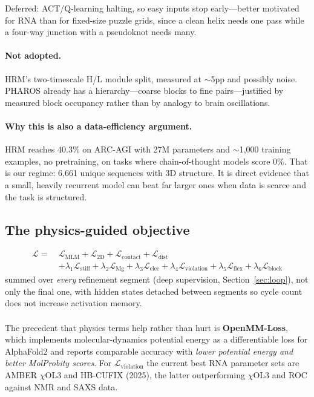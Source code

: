 \documentclass[11pt,a4paper]{article}
\begin{document}
\noindent Deferred: ACT/Q-learning halting, so easy inputs stop early---better
motivated for RNA than for fixed-size puzzle grids, since a clean helix needs one
pass while a four-way junction with a pseudoknot needs many.

\paragraph{Not adopted.} HRM's two-timescale H/L module split, measured at
$\sim$5pp and possibly noise. PHAROS already has a hierarchy---coarse blocks to
fine pairs---justified by measured block occupancy rather than by analogy to
brain oscillations.

\paragraph{Why this is also a data-efficiency argument.} HRM reaches $40.3\%$ on
ARC-AGI with 27M parameters and $\sim$1{,}000 training examples, no pretraining,
on tasks where chain-of-thought models score $0\%$. That is our regime: 6{,}661
unique sequences with 3D structure. It is direct evidence that a small, heavily
recurrent model can beat far larger ones when data is scarce and the task is
structured.

\subsection{The physics-guided objective}
\begin{align}
\mathcal{L} =\ & \mathcal{L}_{\text{MLM}} + \mathcal{L}_{\text{2D}} + \mathcal{L}_{\text{contact}} + \mathcal{L}_{\text{dist}} \nonumber\\
 &+ \lambda_1 \mathcal{L}_{\text{stiff}} + \lambda_2 \mathcal{L}_{\mathrm{Mg}} + \lambda_3 \mathcal{L}_{\text{elec}} + \lambda_4 \mathcal{L}_{\text{violation}} + \lambda_5 \mathcal{L}_{\text{flex}} + \lambda_6 \mathcal{L}_{\text{block}}
\end{align}
\noindent summed over \emph{every} refinement segment (deep supervision,
Section~\ref{sec:loop}), not only the final one, with hidden states detached
between segments so cycle count does not increase activation memory.
\begin{align}
\end{align}

The precedent that physics terms help rather than hurt is \textbf{OpenMM-Loss},
which implements molecular-dynamics potential energy as a differentiable loss for
AlphaFold2 and reports comparable accuracy with \emph{lower potential energy and
better MolProbity scores}. For $\mathcal{L}_{\text{violation}}$ the current best
RNA parameter sets are AMBER $\chi$OL3 and HB-CUFIX (2025), the latter
outperforming $\chi$OL3 and ROC against NMR and SAXS data.
\end{document}
